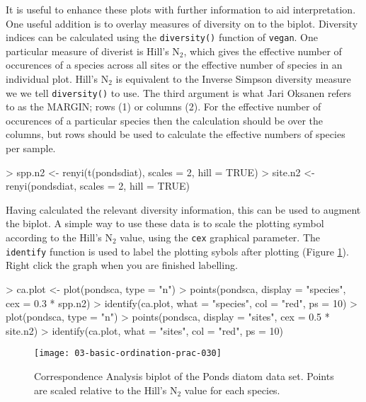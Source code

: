 \documentclass[a4paper,10pt]{article}
\newcommand{\vegan}{\texttt{vegan}\xspace}
\begin{document}
{It is useful to enhance these plots with further information to aid interpretation. One useful addition is to overlay measures of diversity on to the biplot. Diversity indices can be calculated using the \texttt{diversity()} function of \vegan. One particular measure of diverist is Hill's $\mathrm{N_2}$, which gives the effective number of occurences of a species across all sites or the effective number of species in an individual plot. Hill's $\mathrm{N_2}$ is equivalent to the Inverse Simpson diversity measure we we tell \texttt{diversity()} to use. The third argument is what Jari Oksanen refers to as the MARGIN; rows (1) or columns (2). For the effective number of occurences of a particular species then the calculation should be over the columns, but rows should be used to calculate the effective numbers of species per sample.

\begin{Schunk}
\begin{Sinput}
> spp.n2 <- renyi(t(pondsdiat), scales = 2, hill = TRUE)
> site.n2 <- renyi(pondsdiat, scales = 2, hill = TRUE)
\end{Sinput}
\end{Schunk}

Having calculated the relevant diversity information, this can be used to augment the biplot. A simple way to use these data is to scale the plotting symbol according to the Hill's $\mathrm{N_2}$ value, using the \texttt{cex} graphical parameter. The \texttt{identify} function is used to label the plotting sybols after plotting (Figure \ref{ca_biplot2}). Right click the graph when you are finished labelling.

\begin{Schunk}
\begin{Sinput}
> ca.plot <- plot(pondsca, type = "n")
> points(pondsca, display = "species", cex = 0.3 * spp.n2)
> identify(ca.plot, what = "species", col = "red", ps = 10)
> plot(pondsca, type = "n")
> points(pondsca, display = "sites", cex = 0.5 * site.n2)
> identify(ca.plot, what = "sites", col = "red", ps = 10)
\end{Sinput}
\end{Schunk}

\begin{figure}[t]
\begin{center}
\texttt{[image: 03-basic-ordination-prac-030]}
\caption{\label{ca_biplot2}Correspondence Analysis biplot of the Ponds diatom data set. Points are scaled relative to the Hill's $\mathrm{N_2}$ value for each species.}
\end{center}
\end{figure}

}
\end{document}
